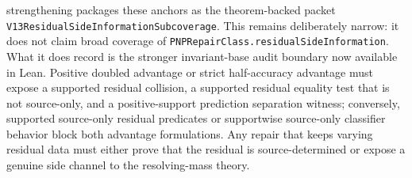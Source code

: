 \documentclass[11pt]{article}
\theoremstyle{remark}
\begin{document}
strengthening packages these anchors as the theorem-backed packet
\texttt{V13ResidualSideInformationSubcoverage}.  This remains deliberately
narrow: it does not claim broad coverage of
\texttt{PNPRepairClass.residualSideInformation}.  What it does record is the
stronger invariant-base audit boundary now available in Lean.  Positive doubled
advantage or strict half-accuracy advantage must expose a supported residual
collision, a supported residual equality test that is not source-only, and a
positive-support prediction separation witness; conversely, supported
source-only residual predicates or supportwise source-only classifier behavior
block both advantage formulations.  Any repair that keeps varying residual data
must either prove that the residual is source-determined or expose a genuine
side channel to the resolving-mass theory.
\end{document}
